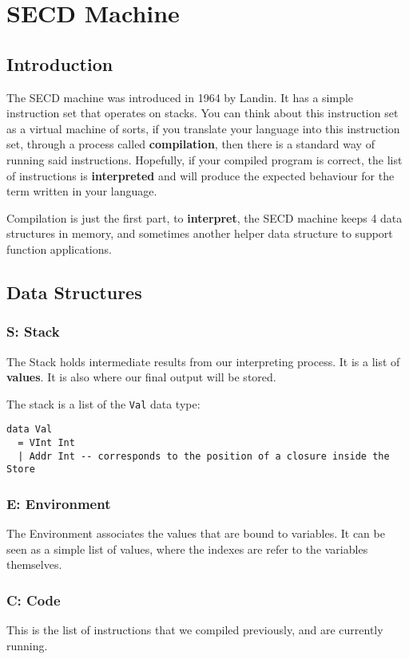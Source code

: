 \section{SECD Machine}
\subsection{Introduction}
The SECD machine was introduced in 1964 by Landin. It has a simple instruction set that operates
on stacks. You can think about this instruction set as a virtual machine of sorts, if you translate
your language into this instruction set, through a process called \textbf{compilation},
then there is a standard way of running said instructions. Hopefully, if your compiled program is
correct, the list of instructions is \textbf{interpreted} and will produce the expected behaviour 
for the term written in your language.

Compilation is just the first part, to \textbf{interpret}, the SECD machine keeps 4 data structures in memory, 
and sometimes another helper data structure to support function applications.

\subsection{Data Structures}
\subsubsection{S: Stack}
The Stack holds intermediate results from our interpreting process. It is a list of \textbf{values}.
It is also where our final output will be stored.

The stack is a list of the \texttt{Val} data type:
\begin{lstlisting}
data Val
  = VInt Int
  | Addr Int -- corresponds to the position of a closure inside the Store
\end{lstlisting}

\subsubsection{E: Environment}
The Environment associates the values that are bound to variables. It can be seen as a simple list of values, where the indexes are refer to the
variables themselves.
\subsubsection{C: Code}
This is the list of instructions that we compiled previously, and are currently running.
